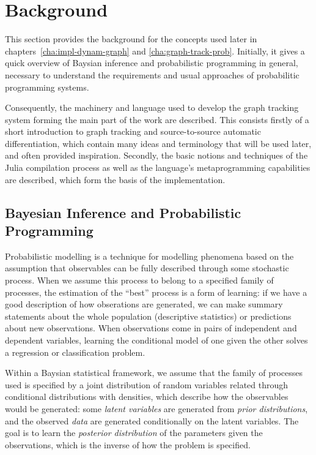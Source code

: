 \chapter{Background}
\label{cha:background}

This section provides the background for the concepts used later in
chapters~\ref{cha:impl-dynam-graph} and \ref{cha:graph-track-prob}.  Initially, it gives a quick
overview of Baysian inference and probabilistic programming in general, necessary to understand the
requirements and usual approaches of probabilitic programming systems.

Consequently, the machinery and language used to develop the graph tracking system forming the main
part of the work are described.  This consists firstly of a short introduction to graph tracking and
source-to-source automatic differentiation, which contain many ideas and terminology that will be
used later, and often provided inspiration.  Secondly, the basic notions and techniques of the Julia
compilation process as well as the language's metaprogramming capabilities are described, which form
the basis of the implementation.


\section{Bayesian Inference and Probabilistic Programming}
\label{sec:bayes-infer-prob}

Probabilistic modelling is a technique for modelling phenomena based on the assumption that
observables can be fully described through some stochastic process.  When we assume this process to
belong to a specified family of processes, the estimation of the \enquote{best} process is a form of
learning: if we have a good description of how obserations are generated, we can make summary
statements about the whole population (descriptive statistics) or predictions about new
observations.  When observations come in pairs of independent and dependent variables, learning the
conditional model of one given the other solves a regression or classification problem.

Within a Baysian statistical framework, we assume that the family of processes used is specified by
a joint distribution of random variables related through conditional distributions with densities,
which describe how the observables would be generated: some \emph{latent variables} are generated
from \emph{prior distributions}, and the observed \emph{data} are generated conditionally on the
latent variables.  The goal is to learn the \emph{posterior distribution} of the parameters given
the observations, which is the inverse of how the problem is specified.

